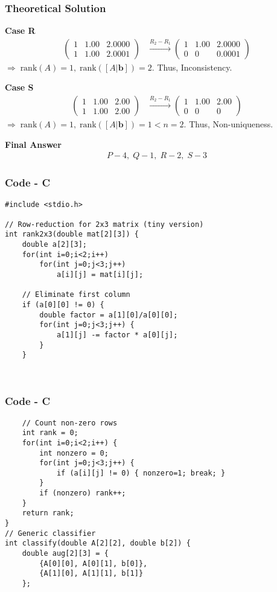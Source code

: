 \documentclass{beamer}
\theoremstyle{remark}
\newcommand{\myvec}[1]{\ensuremath{\begin{pmatrix}#1\end{pmatrix}}}
\let\vec\mathbf
\numberwithin{equation}{section}
\begin{document}
\begin{frame}
\frametitle{Theoretical Solution}
\textbf{Case R}
\begin{align}
\myvec{1 & 1.00 & 2.0000 \\ 1 & 1.00 & 2.0001}
&\xrightarrow{R_2 - R_1}
\myvec{1 & 1.00 & 2.0000 \\ 0 & 0 & 0.0001}
\end{align}
$\Rightarrow \; \text{rank}(A)=1, \;\text{rank}([A|\vec{b}])=2$.  
Thus, Inconsistency.

\textbf{Case S}
\begin{align}
\myvec{1 & 1.00 & 2.00 \\ 1 & 1.00 & 2.00}
&\xrightarrow{R_2 - R_1}
\myvec{1 & 1.00 & 2.00 \\ 0 & 0 & 0}
\end{align}
$\Rightarrow \; \text{rank}(A)=1, \;\text{rank}([A|\vec{b}])=1 < n=2$.  
Thus, Non-uniqueness.

\textbf{Final Answer}
\begin{align}
\boxed{P-4,\; Q-1,\; R-2,\; S-3}
\end{align}


\end{frame}


\begin{frame}[fragile]
    \frametitle{Code - C}
    \begin{lstlisting}
#include <stdio.h>

// Row-reduction for 2x3 matrix (tiny version)
int rank2x3(double mat[2][3]) {
    double a[2][3];
    for(int i=0;i<2;i++)
        for(int j=0;j<3;j++)
            a[i][j] = mat[i][j];

    // Eliminate first column
    if (a[0][0] != 0) {
        double factor = a[1][0]/a[0][0];
        for(int j=0;j<3;j++) {
            a[1][j] -= factor * a[0][j];
        }
    }



    \end{lstlisting}
    \end{frame}

    \begin{frame}[fragile]
    \frametitle{Code - C}
    \begin{lstlisting}
    // Count non-zero rows
    int rank = 0;
    for(int i=0;i<2;i++) {
        int nonzero = 0;
        for(int j=0;j<3;j++) {
            if (a[i][j] != 0) { nonzero=1; break; }
        }
        if (nonzero) rank++;
    }
    return rank;
}
// Generic classifier
int classify(double A[2][2], double b[2]) {
    double aug[2][3] = {
        {A[0][0], A[0][1], b[0]},
        {A[1][0], A[1][1], b[1]}
    };

    \end{lstlisting}
    \end{frame}
\end{document}
